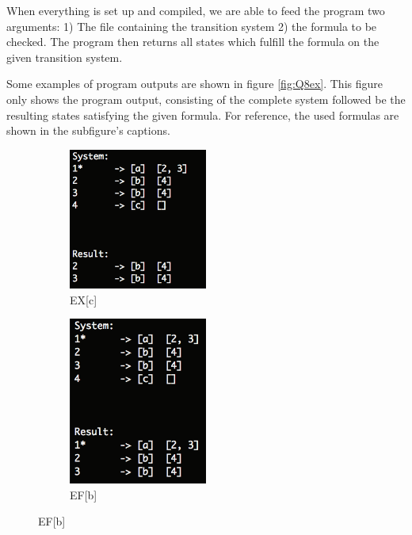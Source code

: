 When everything is set up and compiled, we are able to feed the program two arguments: 1) The file containing the transition system 2) the formula to be checked. The program then returns all states which fulfill the formula on the given transition system.

Some examples of program outputs are shown in figure \ref{fig:Q8ex}. This figure only shows the program output, consisting of the complete system followed be the resulting states satisfying the given formula. For reference, the used formulas are shown in the subfigure's captions.


\begin{figure}[H]
    \begin{subfigure}{0.49\textwidth}
        \centering
        \includegraphics[width=0.5\textwidth]{fig/Q8example1}
        \caption{EX[c]}
        \label{fig:Q8ex1}
    \end{subfigure}
    \begin{subfigure}{0.49\textwidth}
        \centering
        \includegraphics[width=0.5\textwidth]{fig/Q8example2}
        \caption{EF[b]}
        \label{fig:Q8ex2}
    \end{subfigure}

\end{figure}
